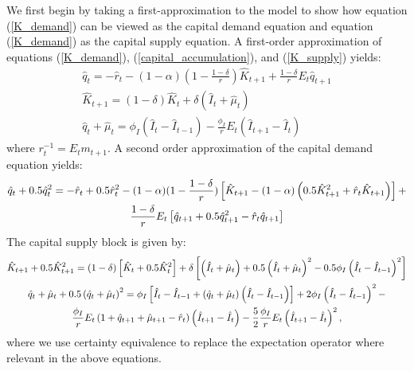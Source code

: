 \documentclass[11pt,fleqn]{article}
\begin{document}
We first begin by taking a first-approximation to the model to show how equation (\ref{K_demand}) can be viewed as the capital demand equation and equation (\ref{K_demand}) as the capital supply equation.  A first-order approximation of equations (\ref{K_demand}), (\ref{capital_accumulation}), and (\ref{K_supply}) yields:
\begin{gather}
\hat{q}_t = -\hat{r}_{t} - (1-\alpha)(1-\frac{1-\delta}{r}) \hat{K}_{t+1} + \frac{1-\delta}{r} E_t \hat{q}_{t+1}  \label{Klin_demand} \\
\hat{K}_{t+1} = (1-\delta) \hat{K}_t + \delta \left( \hat{I}_t + \hat{\mu}_t \right) \label{Klin_accumulation}  \\
\hat{q}_t + \hat{\mu}_t = \phi_I \left( \hat{I}_t - \hat{I}_{t-1} \right) - \frac{\phi_I}{r}  E_t \left( \hat{I}_{t+1} - \hat{I}_{t} \right)  \label{Klin_supply}
\end{gather}
where $r^{-1}_t = E_t m_{t+1}$.
A second order approximation of the capital demand equation yields:
\begin{gather}
\hat{q}_t + 0.5 \hat{q}^2_t  = -\hat{r}_{t} + 0.5 \hat{r}^2_{t} - (1-\alpha)(1-\frac{1-\delta}{r}) \left[ \hat{K}_{t+1} - (1-\alpha) \left(0.5 \hat{K}^2_{t+1} + \hat{r}_t \hat{K}_{t+1} \right) \right] + \\
\frac{1-\delta}{r} E_t \left[ \hat{q}_{t+1} +0.5 \hat{q}^2_{t+1} - \hat{r}_t \hat{q}_{t+1}\right] \notag 
\end{gather}
The capital supply block is given by:
\begin{gather}
\hat{K}_{t+1} + 0.5 \hat{K}^2_{t+1} = (1-\delta) \left[\hat{K}_t + 0.5 \hat{K}^2_{t} \right] + \delta \left[ \left( \hat{I}_t + \hat{\mu}_t \right) + 0.5 \left(\hat{I}_t +\hat{\mu}_t \right)^2 - 0.5 \phi_I \left( \hat{I}_t - \hat{I}_{t-1} \right)^2 \right]  \\
\hat{q}_t + \hat{\mu}_t + 0.5 \left(\hat{q}_t + \hat{\mu}_t \right)^2 = \phi_I \left[ \hat{I}_t - \hat{I}_{t-1} + \left(\hat{q}_t + \hat{\mu}_t \right) \left(  \hat{I}_t - \hat{I}_{t-1}\right) \right] + 2 \phi_I \left(  \hat{I}_t - \hat{I}_{t-1}\right)^2 - \\  
\frac{\phi_I}{r} E_t \left(1+ \hat{q}_{t+1} + \hat{\mu}_{t+1} - \hat{r}_t \right) \left( \hat{I}_{t+1} - \hat{I}_{t} \right) - \frac{5}{2} \frac{\phi_I}{r}  E_t \left( \hat{I}_{t+1} - \hat{I}_{t} \right)^2, \notag
\end{gather}
where we use certainty equivalence to replace the expectation operator where relevant in the above equations.
\end{document}

